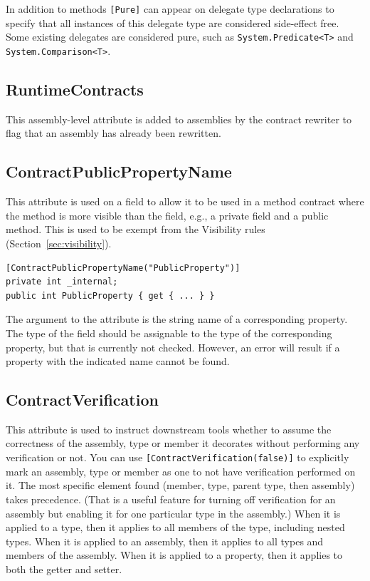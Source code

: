 \documentclass{article}
\newcommand{\code}[1]{\lstinline{#1}}
\begin{document}
In addition to methods \code{[Pure]} can appear on delegate type
declarations to specify that all instances of this delegate type are
considered side-effect free. Some existing delegates are considered
pure, such as \code{System.Predicate<T>} and \code{System.Comparison<T>}.

\subsection{RuntimeContracts}
This assembly-level attribute is added to assemblies by the contract
rewriter to flag that an assembly has already been rewritten.

\subsection{ContractPublicPropertyName}
\label{sec:contractpublicattribute}
This attribute is used on a field to allow it to be used in a method
contract where the method is more visible than the field, e.g., a
private field and a public method. This is used to be exempt from the
Visibility rules (Section~\ref{sec:visibility}).
\begin{lstlisting}
[ContractPublicPropertyName("PublicProperty")]
private int _internal;
public int PublicProperty { get { ... } }
\end{lstlisting}
The argument to the attribute is the string name of a corresponding
property. The type of the field should be assignable to the type of
the corresponding property, but that is currently not
checked. However, an error will result if a property with the
indicated name cannot be found.

\subsection{ContractVerification}
This attribute is used to instruct downstream tools whether to assume
the correctness of the assembly, type or member it decorates without
performing any verification or not. You can use
\code{[ContractVerification(false)]} to explicitly mark an assembly, type or
member as one to not have verification performed on it. The most
specific element found (member, type, parent type, then assembly)
takes precedence.  (That is a useful feature for turning off
verification for an assembly but enabling it for one particular type
in the assembly.) When it is applied to a type, then it applies to all
members of the type, including nested types. When it is applied to an
assembly, then it applies to all types and members of the
assembly. When it is applied to a property, then it applies to both
the getter and setter.
\end{document}
